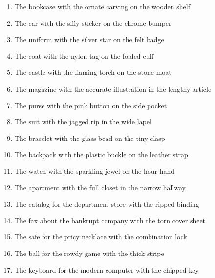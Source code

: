 \documentclass[12pt,titlepage]{article}
\begin{document}
\begin{enumerate}


\item The bookcase with the ornate carving on the wooden shelf
    
\item The car with the silly sticker on the chrome bumper
    
\item The uniform with the silver star on the felt badge
    
\item The coat with the nylon tag on the folded cuff
    
\item The castle with the flaming torch on the stone moat
    
\item The magazine with the accurate illustration in the lengthy article
    
\item The purse with the pink button on the side pocket
    
\item The suit with the jagged rip in the wide lapel
    
\item The bracelet with the glass bead on the tiny clasp
    
\item The backpack with the plastic buckle on the leather strap
    
\item The watch with the sparkling jewel on the hour hand
    
\item The apartment with the full closet in the narrow hallway

    
\item The catalog for the department store with the ripped binding
    
\item The fax about the bankrupt company with the torn cover sheet
    
\item The safe for the pricy necklace with the combination lock
    
\item The ball for the rowdy game with the thick stripe
    
\item The keyboard for the modern computer with the chipped key
    

\end{enumerate}
\end{document}
